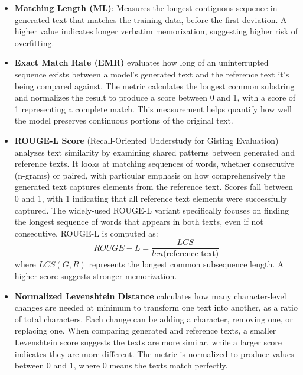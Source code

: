 \begin{itemize}
    \item \textbf{Matching Length (ML)}: Measures the longest contiguous sequence in generated text that matches the training data, before the first deviation. A higher value indicates longer verbatim memorization, suggesting higher risk of overfitting.

    \item \textbf{Exact Match Rate (EMR)} evaluates how long of an uninterrupted sequence exists between a model's generated text and the reference text it's being compared against. The metric calculates the longest common substring and normalizes the result to produce a score between 0 and 1, with a score of 1 representing a complete match. This measurement helps quantify how well the model preserves continuous portions of the original text.

    \item \textbf{ROUGE-L Score} (Recall-Oriented Understudy for Gisting Evaluation) analyzes text similarity by examining shared patterns between generated and reference texts. It looks at matching sequences of words, whether consecutive (n-grams) or paired, with particular emphasis on how comprehensively the generated text captures elements from the reference text. Scores fall between 0 and 1, with 1 indicating that all reference text elements were successfully captured. The widely-used ROUGE-L variant specifically focuses on finding the longest sequence of words that appears in both texts, even if not consecutive. ROUGE-L is computed as:
    \begin{equation}
        ROUGE-L = \frac{LCS}{len\text{(reference text)}}
    \end{equation}
    where \( LCS(G, R) \) represents the longest common subsequence length. A higher score suggests stronger memorization.

    \item \textbf{Normalized Levenshtein Distance} calculates how many character-level changes are needed at minimum to transform one text into another, as a ratio of total characters. Each change can be adding a character, removing one, or replacing one. When comparing generated and reference texts, a smaller Levenshtein score suggests the texts are more similar, while a larger score indicates they are more different. The metric is normalized to produce values between 0 and 1, where 0 means the texts match perfectly.
\end{itemize}

